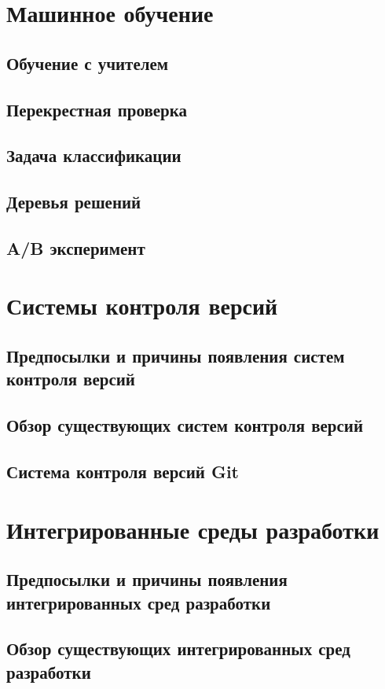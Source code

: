 \section{Машинное обучение}
    \subsection{Обучение с учителем}
    \subsection{Перекрестная проверка}
    \subsection{Задача классификации}
    \subsection{Деревья решений}
    \subsection{A/B эксперимент}
\section{Системы контроля версий}
    \subsection{Предпосылки и причины появления систем контроля версий}
    \subsection{Обзор существующих систем контроля версий}
    \subsection{Система контроля версий Git}
\section{Интегрированные среды разработки}
    \subsection{Предпосылки и причины появления интегрированных сред разработки}
    \subsection{Обзор существующих интегрированных сред разработки}
